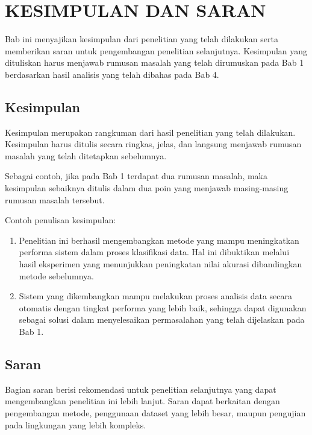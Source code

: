 \chapter{KESIMPULAN DAN SARAN}

Bab ini menyajikan kesimpulan dari penelitian yang telah dilakukan serta
memberikan saran untuk pengembangan penelitian selanjutnya. Kesimpulan
yang dituliskan harus menjawab rumusan masalah yang telah dirumuskan
pada Bab 1 berdasarkan hasil analisis yang telah dibahas pada Bab 4.

\section{Kesimpulan}

Kesimpulan merupakan rangkuman dari hasil penelitian yang telah
dilakukan. Kesimpulan harus ditulis secara ringkas, jelas, dan langsung
menjawab rumusan masalah yang telah ditetapkan sebelumnya.

Sebagai contoh, jika pada Bab 1 terdapat dua rumusan masalah, maka
kesimpulan sebaiknya ditulis dalam dua poin yang menjawab masing-masing
rumusan masalah tersebut.

Contoh penulisan kesimpulan:

\begin{enumerate}

\item Penelitian ini berhasil mengembangkan metode yang mampu
meningkatkan performa sistem dalam proses klasifikasi data.
Hal ini dibuktikan melalui hasil eksperimen yang menunjukkan
peningkatan nilai akurasi dibandingkan metode sebelumnya.

\item Sistem yang dikembangkan mampu melakukan proses analisis data
secara otomatis dengan tingkat performa yang lebih baik, sehingga
dapat digunakan sebagai solusi dalam menyelesaikan permasalahan
yang telah dijelaskan pada Bab 1.

\end{enumerate}

\section{Saran}

Bagian saran berisi rekomendasi untuk penelitian selanjutnya yang dapat
mengembangkan penelitian ini lebih lanjut. Saran dapat berkaitan dengan
pengembangan metode, penggunaan dataset yang lebih besar, maupun
pengujian pada lingkungan yang lebih kompleks.

